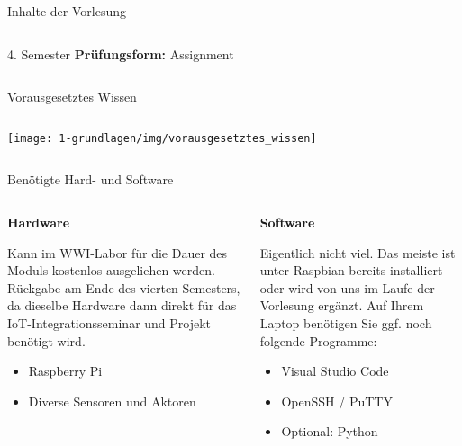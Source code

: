 {\begin{frame}{Inhalte der Vorlesung}
\begin{columns}
\begin{column}[T]{.5\textwidth}
\begin{block}{4. Semester}
                    \medskip
                    \textbf{Prüfungsform:} Assignment
                \end{block}
            \end{column}
        \end{columns}
\end{frame}
}

\begin{frame}{Vorausgesetztes Wissen}
    \begin{columns}
        \column{\dimexpr\paperwidth-10pt}
        \texttt{[image: 1-grundlagen/img/vorausgesetztes\_wissen]}
    \end{columns}
\end{frame}


\begin{frame}{Benötigte Hard- und Software}
        \begin{columns}
            \begin{column}[T]{.5\textwidth}
                \textbf{Hardware}
                \medskip

                \parbox{\linewidth}{
                    \footnotesize
                    Kann im WWI-Labor für die Dauer des Moduls kostenlos ausgeliehen
                    werden. Rückgabe am Ende des vierten Semesters, da dieselbe
                    Hardware dann direkt für das IoT-Integrationsseminar und Projekt
                    benötigt wird.
                }
                \medskip

                \begin{itemize}
                    \item Raspberry Pi
                    \item Diverse Sensoren und Aktoren
                \end{itemize}
            \end{column}
            \begin{column}[T]{.5\textwidth}
                \textbf{Software}
                \medskip

                \parbox{\linewidth}{
                    \footnotesize
                    Eigentlich nicht viel. Das meiste ist unter Raspbian bereits
                    installiert oder wird von uns im Laufe der Vorlesung ergänzt.
                    Auf Ihrem Laptop benötigen Sie ggf. noch folgende Programme:
                }
                \medskip

                \begin{itemize}
                    \item Visual Studio Code
                    \item OpenSSH / PuTTY
                    \item Optional: Python
                \end{itemize}
            \end{column}
        \end{columns}
\end{frame}

